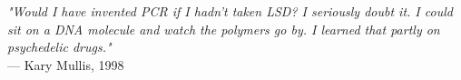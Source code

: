 \begin{flushright}
\emph{"Would I have invented PCR if I hadn’t taken LSD? I seriously doubt it. I could sit on a DNA molecule and watch the polymers go by. I learned that partly on psychedelic drugs."}\\
— Kary Mullis, 1998
\end{flushright}
